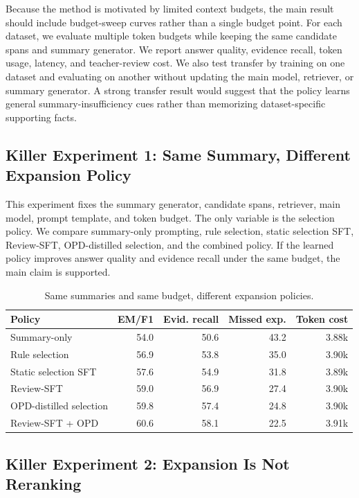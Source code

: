 \documentclass[11pt]{article}
\begin{document}
Because the method is motivated by limited context budgets, the main result should include budget-sweep curves rather than a single budget point. For each dataset, we evaluate multiple token budgets while keeping the same candidate spans and summary generator. We report answer quality, evidence recall, token usage, latency, and teacher-review cost. We also test transfer by training on one dataset and evaluating on another without updating the main model, retriever, or summary generator. A strong transfer result would suggest that the policy learns general summary-insufficiency cues rather than memorizing dataset-specific supporting facts.

\subsection{Killer Experiment 1: Same Summary, Different Expansion Policy}

This experiment fixes the summary generator, candidate spans, retriever, main model, prompt template, and token budget. The only variable is the selection policy. We compare summary-only prompting, rule selection, static selection SFT, Review-SFT, OPD-distilled selection, and the combined policy. If the learned policy improves answer quality and evidence recall under the same budget, the main claim is supported.

\begin{table}[t]
\centering
\small
\begin{tabular}{lrrrr}
\toprule
Policy & EM/F1 & Evid. recall & Missed exp. & Token cost \\
\midrule
Summary-only & 54.0 & 50.6 & 43.2 & 3.88k \\
Rule selection & 56.9 & 53.8 & 35.0 & 3.90k \\
Static selection SFT & 57.6 & 54.9 & 31.8 & 3.89k \\
Review-SFT & 59.0 & 56.9 & 27.4 & 3.90k \\
OPD-distilled selection & 59.8 & 57.4 & 24.8 & 3.90k \\
Review-SFT + OPD & 60.6 & 58.1 & 22.5 & 3.91k \\
\bottomrule
\end{tabular}
\caption{Same summaries and same budget, different expansion policies.}
\label{tab:killer1}
\end{table}

\subsection{Killer Experiment 2: Expansion Is Not Reranking}
\end{document}
